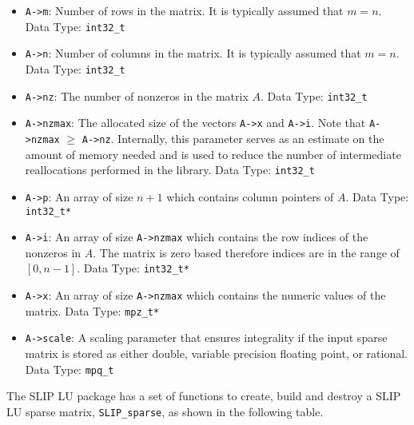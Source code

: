 \documentclass[11pt]{article}
\theoremstyle{definition}
\begin{document}
\begin{itemize}
\item \verb|A->m|: Number of rows in the matrix. It is typically assumed that
$m=n$.  Data Type: \verb|int32_t|

\item \verb|A->n|: Number of columns in the matrix. It is typically assumed
that $m=n$. Data Type: \verb|int32_t|

\item \verb|A->nz|: The number of nonzeros in the matrix $A$. Data Type:
\verb|int32_t|

\item \verb|A->nzmax|: The allocated size of the vectors \verb|A->x| and
\verb|A->i|. Note that \verb|A->nzmax| $\geq$ \verb|A->nz|. Internally, this
parameter serves as an estimate on the amount of memory needed and is used to
reduce the number of intermediate reallocations performed in the library. Data
Type: \verb|int32_t|

\item \verb|A->p|: An array of size $n+1$ which contains column pointers of
$A$. Data Type: \verb|int32_t*|

\item \verb|A->i|: An array of size \verb|A->nzmax| which contains the row
indices of the nonzeros in $A$. The matrix is zero based therefore indices are
in the range of $[0, n-1]$. Data Type: \verb|int32_t*|

\item \verb|A->x|: An array of size \verb|A->nzmax| which contains the numeric
values of the matrix. Data Type: \verb|mpz_t*|

\item \verb|A->scale|: A scaling parameter that ensures integrality if the
input sparse matrix is stored as either double, variable precision floating
point, or rational. Data Type: \verb|mpq_t|

\end{itemize}

The SLIP LU package has a set of functions to create, build and destroy a SLIP
LU sparse matrix, \verb|SLIP_sparse|, as shown in the following table.
\end{document}
